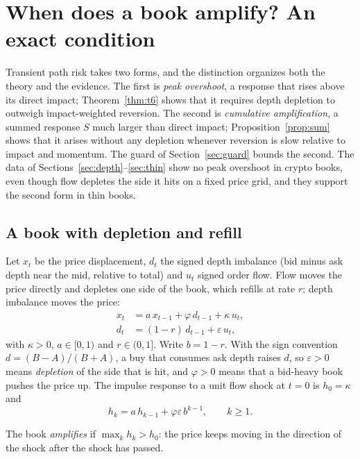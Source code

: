 \section{When does a book amplify? An exact condition}\label{sec:t6}

Transient path risk takes two forms, and the distinction organizes both the theory and the evidence. The first is \emph{peak overshoot}, a response that rises above its direct impact; Theorem~\ref{thm:t6} shows that it requires depth depletion to outweigh impact-weighted reversion. The second is \emph{cumulative amplification}, a summed response $S$ much larger than direct impact; Proposition~\ref{prop:sum} shows that it arises without any depletion whenever reversion is slow relative to impact and momentum. The guard of Section~\ref{sec:guard} bounds the second. The data of Sections~\ref{sec:depth}--\ref{sec:thin} show no peak overshoot in crypto books, even though flow depletes the side it hits on a fixed price grid, and they support the second form in thin books.

\subsection{A book with depletion and refill}
Let $x_t$ be the price displacement, $d_t$ the signed depth imbalance (bid minus ask depth near the mid, relative to total) and $u_t$ signed order flow. Flow moves the price directly and depletes one side of the book, which refills at rate $r$; depth imbalance moves the price:
\begin{align}
x_t &= a\,x_{t-1} + \varphi\,d_{t-1} + \kappa\,u_t, \label{eq:x}\\
d_t &= (1-r)\,d_{t-1} + \varepsilon\,u_t, \label{eq:d}
\end{align}
with $\kappa>0$, $a\in[0,1)$ and $r\in(0,1]$. Write $b=1-r$. With the sign convention $d=(B-A)/(B+A)$, a buy that consumes ask depth raises $d$, so $\varepsilon>0$ means \emph{depletion} of the side that is hit, and $\varphi>0$ means that a bid-heavy book pushes the price up. The impulse response to a unit flow shock at $t=0$ is $h_0=\kappa$ and
\begin{equation}\label{eq:rec}
h_k=a\,h_{k-1}+\varphi\varepsilon\,b^{k-1},\qquad k\ge1.
\end{equation}

\begin{definition}
The book \emph{amplifies} if $\max_kh_k>h_0$: the price keeps moving in the direction of the shock after the shock has passed.
\end{definition}

